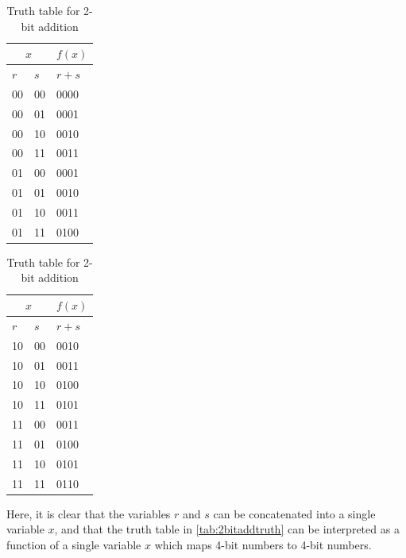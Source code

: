 \begin{table}[!htb]
    \caption{Truth table for 2-bit addition}
    \label{tab:2bitaddtruth}
    \begin{subtable}{.5\linewidth}
      \centering
        \begin{tabular}{|l|l||l|}
        \hline
        \multicolumn{2}{|c||}{$x$} & $f(x)$\\
        \hline
        $r$ & $s$ & $r+s$ \\ \hline
        00       & 00       & 0000       \\ 
        00       & 01       & 0001       \\ 
        00       & 10       & 0010       \\ 
        00       & 11       & 0011       \\
        01       & 00       & 0001       \\ 
        01       & 01       & 0010       \\ 
        01       & 10       & 0011       \\ 
        01       & 11       & 0100       \\
        \hline
    \end{tabular}
    \end{subtable}
    \begin{subtable}{.5\linewidth}
      \centering
        \begin{tabular}{|l|l||l|}
        \hline
        \multicolumn{2}{|c||}{$x$} & $f(x)$\\
        \hline
        $r$ & $s$ & $r+s$ \\ \hline
        10       & 00       & 0010       \\ 
        10       & 01       & 0011       \\ 
        10       & 10       & 0100       \\ 
        10       & 11       & 0101       \\
        11       & 00       & 0011       \\ 
        11       & 01       & 0100       \\ 
        11       & 10       & 0101       \\ 
        11       & 11       & 0110       \\
        \hline
    \end{tabular}
    \end{subtable} 
\end{table}

Here, it is clear that the variables $r$ and $s$ can be concatenated into a single variable $x$, and that the truth table in \autoref{tab:2bitaddtruth} can be interpreted as a function of a single variable $x$ which maps 4-bit numbers to 4-bit numbers. 

